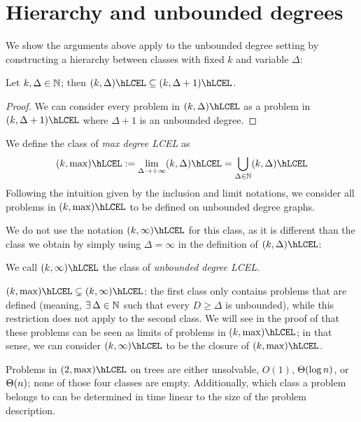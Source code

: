 \documentclass[12pt,a4paper]{article}
\begin{document}
\section{Hierarchy and unbounded degrees}
We show the arguments above apply to the unbounded degree setting by constructing a hierarchy between classes with fixed $k$ and variable $\Delta$:
\begin{lem}
    Let $k,\Delta\in\mathbb{N}$; then $(k,\Delta)\hLCEL\subseteq (k,\Delta+1)\hLCEL$.
\end{lem}
\begin{proof}
    We can consider every problem in $(k,\Delta)\hLCEL$ as a problem in $(k,\Delta+1)\hLCEL$ where $\Delta+1$ is an unbounded degree.
\end{proof}
\begin{defn}
    We define the class of \emph{max degree LCEL} as
    $$(k,\max)\hLCEL :=\lim_{\Delta\to+\infty}(k,\Delta)\hLCEL = \bigcup_{\Delta\in\N}(k,\Delta)\hLCEL$$
    Following the intuition given by the inclusion and limit notations, we consider all problems in $(k,\max)\hLCEL$ to be defined on unbounded degree graphs.
\end{defn}
We do not use the notation $(k,\infty)\hLCEL$ for this class, as it is different than the class we obtain by simply using $\Delta=\infty$ in the definition of $(k,\Delta)\hLCEL$:
\begin{defn}
    We call $(k,\infty)\hLCEL$ the class of \emph{unbounded degree LCEL}.
\end{defn}
\begin{obs}
    $(k,\max)\hLCEL\subsetneq (k,\infty)\hLCEL$: the first class only contains problems that are defined  (meaning, $\exists\Delta\in\N$ such that every $D\geq\Delta$ is unbounded), while this restriction does not apply to the second class. We will see in the proof of  that these problems can be seen as limits of problems in $(k,\max)\hLCEL$; in that sense, we can consider $(k,\infty)\hLCEL$ to be the closure of $(k,\max)\hLCEL$.
\end{obs}
\begin{thm}\label{thm:maxclass}
    Problems in $(2,\max)\hLCEL$ on trees are either unsolvable, $O(1)$, $\Theta(\log n)$, or $\Theta(n)$; none of those four classes are empty. Additionally, which class a problem belongs to can be determined in time linear to the size of the problem description.
\end{thm}
\end{document}
